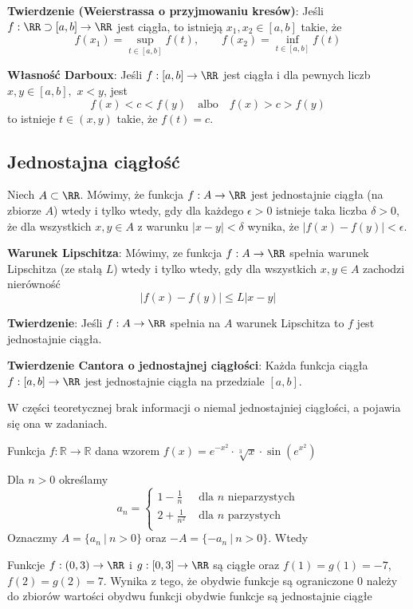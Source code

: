\textbf{Twierdzenie (Weierstrassa o przyjmowaniu kresów)}:
Jeśli $f:\RR\supset[a,b]\to\RR$ jest ciągła, to istnieją $x_1,x_2\in[a,b]$ takie, że
$$f(x_1)=\sup_{t\in[a,b]}f(t),\qquad f(x_2)=\inf_{t\in[a,b]}f(t)$$

\textbf{Własność Darboux}:
Jeśli $f:[a,b]\to\RR$ jest ciągła i dla pewnych liczb $x,y\in[a,b],$ $x<y$, jest
$$f(x)<c<f(y)\quad\text{albo}\quad f(x)>c>f(y)$$
to istnieje $t\in(x,y)$ takie, że $f(t)=c$.

\subsection{Jednostajna ciągłość}
Niech $A\subset\RR$. Mówimy, że funkcja $f:A\to\RR$ jest jednostajnie ciągła (na zbiorze $A$) wtedy i tylko wtedy, gdy dla każdego $\epsilon>0$ istnieje taka liczba $\delta>0$, że dla wszystkich $x,y\in A$ z warunku $|x-y|<\delta$ wynika, że $|f(x)-f(y)|<\epsilon$.

\textbf{Warunek Lipschitza}:
Mówimy, ze funkcja $f:A\to\RR$ spełnia warunek Lipschitza (ze stałą $L$) wtedy i tylko wtedy, gdy dla wszystkich $x,y\in A$ zachodzi nierówność
$$|f(x)-f(y)|\leq L|x-y|$$

\textbf{Twierdzenie}: Jeśli $f:A\to\RR$ spełnia na $A$ warunek Lipschitza to $f$ jest jednostajnie ciągła.

\textbf{Twierdzenie Cantora o jednostajnej ciągłości}: Każda funkcja ciągła $f:[a,b]\to\RR$ jest jednostajnie ciągła na przedziale $[a,b]$.

\begin{editorsnote}
    W części teoretycznej brak informacji o niemal jednostajniej ciągłości, a pojawia się ona w zadaniach.
\end{editorsnote}

\begin{problems}
    \prob Funkcja $\textit{f}: \mathbb{R} \xrightarrow{} \mathbb{R}$ dana wzorem $f(x) = e^{-x^2} \cdot \sqrt[3]{x} \cdot \sin(e^{x^2})$

    \prob Dla $n > 0$ określamy
    $$ a_n = 
    \begin{cases}
        1 - \frac{1}{n} & \text{ dla } n \text{ nieparzystych} \\
        2 + \frac{1}{n^2} & \text{ dla } n \text{ parzystych} \\
    \end{cases}
    $$
    Oznaczmy $A = \{ a_n \ | \ n > 0 \}$ oraz $-A = \{-a_n \ | \ n > 0\}$. Wtedy

    \prob Funkcje $f : (0, 3) \to \RR$ i $g : [0, 3] \to \RR$ są ciągłe oraz $f(1) = g(1) = -7$, $f(2) = g(2) = 7$. Wynika z tego, że
    \answers
    {obydwie funkcje są ograniczone}
    {0 należy do zbiorów wartości obydwu funkcji}
    {obydwie funkcje są jednostajnie ciągłe}
\end{problems}

